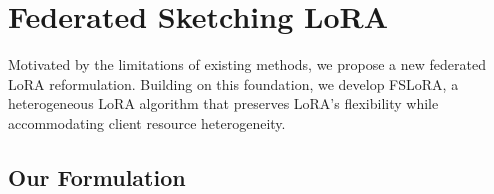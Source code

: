 \documentclass{article} %
\theoremstyle{plain}
\theoremstyle{definition}
\begin{document}
\section{Federated Sketching LoRA} 
\vspace{-0.5mm}

Motivated by the limitations of existing methods, we propose a new federated LoRA reformulation. Building on this foundation, we develop FSLoRA, a heterogeneous LoRA algorithm that preserves LoRA's flexibility while accommodating client resource heterogeneity.




\subsection{Our Formulation}
\end{document}
